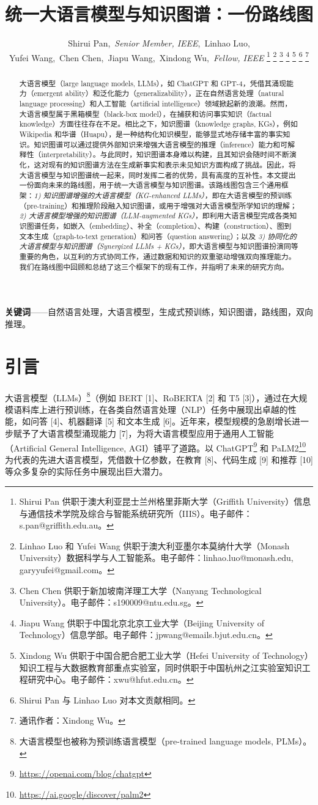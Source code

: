 \documentclass[11pt,UTF8,fontset=fandol]{ctexart}
\title{\textbf{统一大语言模型与知识图谱：一份路线图}}
\author{Shirui Pan,~\textit{Senior Member, IEEE},~Linhao Luo,\\
Yufei Wang,~Chen Chen,~Jiapu Wang,~Xindong Wu,~\textit{Fellow, IEEE}%
\thanks{Shirui Pan 供职于澳大利亚昆士兰州格里菲斯大学（Griffith University）信息与通信技术学院及综合与智能系统研究所（IIIS）。电子邮件：s.pan@griffith.edu.au。}%
\thanks{Linhao Luo 和 Yufei Wang 供职于澳大利亚墨尔本莫纳什大学（Monash University）数据科学与人工智能系。电子邮件：linhao.luo@monash.edu, garyyufei@gmail.com。}%
\thanks{Chen Chen 供职于新加坡南洋理工大学（Nanyang Technological University）。电子邮件：s190009@ntu.edu.sg。}%
\thanks{Jiapu Wang 供职于中国北京北京工业大学（Beijing University of Technology）信息学部。电子邮件：jpwang@emails.bjut.edu.cn。}%
\thanks{Xindong Wu 供职于中国合肥合肥工业大学（Hefei University of Technology）知识工程与大数据教育部重点实验室，同时供职于中国杭州之江实验室知识工程研究中心。电子邮件：xwu@hfut.edu.cn。}%
\thanks{Shirui Pan 与 Linhao Luo 对本文贡献相同。}%
\thanks{通讯作者：Xindong Wu。}%
}
\date{}
\begin{document}
\maketitle

\begin{abstract}
大语言模型（large language models, LLMs），如 ChatGPT 和 GPT-4，凭借其涌现能力（emergent ability）和泛化能力（generalizability），正在自然语言处理（natural language processing）和人工智能（artificial intelligence）领域掀起新的浪潮。然而，大语言模型属于黑箱模型（black-box model），在捕获和访问事实知识（factual knowledge）方面往往存在不足。相比之下，知识图谱（knowledge graphs, KGs），例如 Wikipedia 和华谱（Huapu），是一种结构化知识模型，能够显式地存储丰富的事实知识。知识图谱可以通过提供外部知识来增强大语言模型的推理（inference）能力和可解释性（interpretability）。与此同时，知识图谱本身难以构建，且其知识会随时间不断演化，这对现有的知识图谱方法在生成新事实和表示未见知识方面构成了挑战。因此，将大语言模型与知识图谱统一起来，同时发挥二者的优势，具有高度的互补性。本文提出一份面向未来的路线图，用于统一大语言模型与知识图谱。该路线图包含三个通用框架：\textit{1) 知识图谱增强的大语言模型（KG-enhanced LLMs）}，即在大语言模型的预训练（pre-training）和推理阶段融入知识图谱，或用于增强对大语言模型所学知识的理解；\textit{2) 大语言模型增强的知识图谱（LLM-augmented KGs）}，即利用大语言模型完成各类知识图谱任务，如嵌入（embedding）、补全（completion）、构建（construction）、图到文本生成（graph-to-text generation）和问答（question answering）；以及 \textit{3) 协同化的大语言模型与知识图谱（Synergized LLMs + KGs）}，即大语言模型与知识图谱扮演同等重要的角色，以互利的方式协同工作，通过数据和知识的双重驱动增强双向推理能力。我们在路线图中回顾和总结了这三个框架下的现有工作，并指明了未来的研究方向。
\end{abstract}

\noindent\textbf{关键词}——自然语言处理，大语言模型，生成式预训练，知识图谱，路线图，双向推理。

\section{引言}

大语言模型（LLMs）\footnote{大语言模型也被称为预训练语言模型（pre-trained language models, PLMs）。}（例如 BERT [1]、RoBERTA [2] 和 T5 [3]），通过在大规模语料库上进行预训练，在各类自然语言处理（NLP）任务中展现出卓越的性能，如问答 [4]、机器翻译 [5] 和文本生成 [6]。近年来，模型规模的急剧增长进一步赋予了大语言模型涌现能力 [7]，为将大语言模型应用于通用人工智能（Artificial General Intelligence, AGI）铺平了道路。以 ChatGPT\footnote{\url{https://openai.com/blog/chatgpt}} 和 PaLM2\footnote{\url{https://ai.google/discover/palm2}} 为代表的先进大语言模型，凭借数十亿参数，在教育 [8]、代码生成 [9] 和推荐 [10] 等众多复杂的实际任务中展现出巨大潜力。
\end{document}
